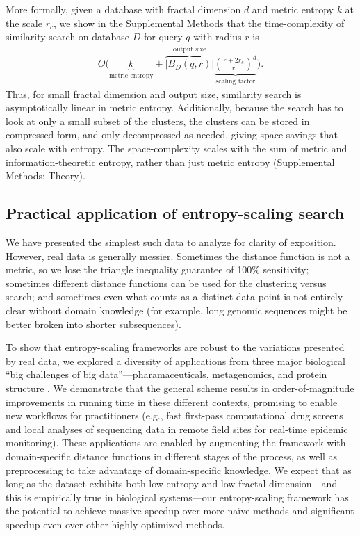 \documentclass[review,preprint,12pt]{elsarticle}
\renewcommand{\cite}{\citep} %
\theoremstyle{definition}
\theoremstyle{remark}
\numberwithin{equation}{section}
\begin{document}
More formally, given a database with fractal dimension $d$ and metric entropy $k$ at the scale $r_c$, we show in the Supplemental Methods that the time-complexity of similarity search on database $D$ for query $q$ with radius $r$ is
\begin{gather*}
    O\Bigg(
    \underbrace{k}_{\textrm{metric entropy}} +
    \overbrace{\left|B_D(q,r)\right|}^{\textrm{output size}}
    \underbrace{\left(\frac{r+2r_c}{r}\right)^d}_{\textrm{scaling factor}}
     \Bigg) .
\end{gather*}
Thus, for small fractal dimension and output size, similarity search is asymptotically linear in metric entropy.
Additionally, because the search has to look at only a small subset of the clusters, the clusters can be stored in compressed form, and only decompressed as needed, giving space savings that also scale with entropy.
The space-complexity scales with the sum of metric and information-theoretic entropy, rather than just metric entropy 
(Supplemental Methods: Theory).

\subsection{Practical application of entropy-scaling search}
We have presented the simplest such data to analyze for clarity of exposition.
However, real data is generally messier.
Sometimes the distance function is not a metric, so we lose the triangle inequality guarantee of 100\% sensitivity;
sometimes different distance functions can be used for the clustering versus search;
and sometimes even what counts as a distinct data point is not entirely clear without domain knowledge (for example, long genomic sequences might be better broken into shorter subsequences).

To show that entropy-scaling frameworks are robust to the variations presented by real data,
we explored a diversity of applications from three major biological ``big challenges of big data''---pharamaceuticals, metagenomics, and protein structure \cite{marx2013biology}.
We demonstrate that the general scheme results in order-of-magnitude improvements in running time in these different contexts, promising to enable new workflows for practitioners (e.g., fast first-pass computational drug screens and local analyses of sequencing data in remote field sites for real-time epidemic monitoring).
These applications are enabled by augmenting the framework with domain-specific distance functions in different stages of the process, as well as preprocessing to take advantage of domain-specific knowledge.
We expect that as long as the dataset exhibits both low entropy and low 
fractal dimension---and this is empirically true in biological systems---our 
entropy-scaling framework has the potential to achieve massive speedup 
over more na\"ive methods and significant speedup even over other highly 
optimized methods.
\end{document}
